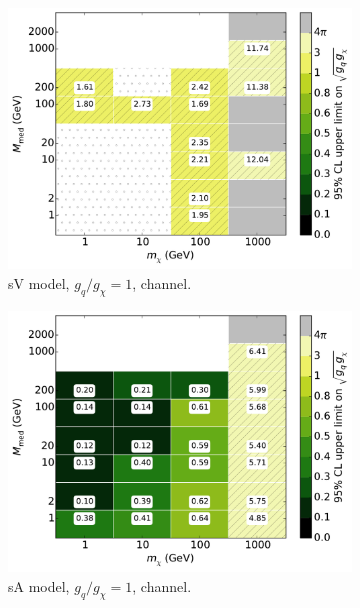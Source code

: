 \begin{figure}
\begin{subfigure}[t]{0.32\textwidth}
    \centering
    \includegraphics[width=1.\textwidth]{figures/grid_basepoints_SVD_rat1_monoWZ.pdf}
    \caption{sV model, $g_q/g_{\chi} = 1$, \monoWZ channel.}
    \vspace{0.75cm}
  \end{subfigure}
  \begin{subfigure}[t]{0.32\textwidth}
    \centering
    \includegraphics[width=1.\textwidth]{figures/grid_basepoints_SVD_rat1_monojet.pdf}  %
    \caption{sA model, $g_q/g_{\chi} = 1$, \monojet channel.}
  \end{subfigure}
  \begin{subfigure}[t]{0.32\textwidth}
    \centering

\end{subfigure}
\end{figure}
